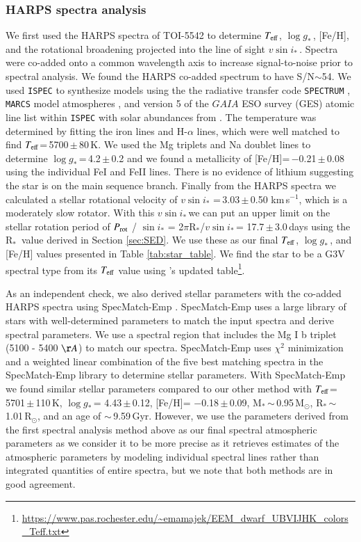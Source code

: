 \documentclass{aa}
\newcommand{\feh}{\mbox{[Fe/H]}\xspace}
\newcommand{\teff}{\ensuremath{T_{\rm eff}}\xspace}
\newcommand{\logg}{\mbox{$\log g_*$}\,}
\newcommand{\vsini}{\mbox{$v \sin i_{*}$}\,}
\newcommand{\mstar}{\mbox{M$_{*}$}}
\newcommand{\rstar}{\mbox{R$_{*}$}}
\newcommand{\msol}{\mbox{$\mathrm{M_\odot}$}\xspace}
\newcommand{\rsol}{\mbox{$\mathrm{R_\odot}$}\xspace}
\begin{document}
\subsubsection{HARPS spectra analysis}

We first used the HARPS spectra of TOI-5542 to determine \teff, \logg, \feh, and the rotational broadening projected into the line of sight \vsini. Spectra were co-added onto a common wavelength axis to increase signal-to-noise prior to spectral analysis. We found the HARPS co-added spectrum to have S/N$\sim$54. We used \texttt{ISPEC} \citep{Blanco-Cuaresma2014} to synthesize models using the the radiative transfer code \texttt{SPECTRUM} \citep{Gray1999}, \texttt{MARCS} model atmospheres \citep{Gustafsson2008}, and version 5 of the $GAIA$ ESO survey (GES) atomic line list within \texttt{ISPEC} with solar abundances from \citet{Asplund2009}. The temperature was determined by fitting the iron lines and H-$\alpha$ lines, which were well matched to find \teff=\,5700\,$\pm$\,80\,K. We used the Mg triplets and Na doublet lines to determine \logg=\,4.2\,$\pm$\,0.2 and we found a metallicity of \feh=\,$-$0.21\,$\pm$\,0.08 using the individual FeI and FeII lines. There is no evidence of lithium suggesting the star is on the main sequence branch. Finally from the HARPS spectra we calculated a stellar rotational velocity of \vsini\,=\,3.03\,$\pm$\,0.50 km\,s$^{-1}$, which is a moderately slow rotator. With this \vsini we can put an upper limit on the stellar rotation period of $P_{\rm rot}$ / $\sin i_{*}$ = 2$\pi$\rstar/\vsini = 17.7\,$\pm$\,3.0\,days using the \rstar\, value derived in Section \ref{sec:SED}. We use these as our final \teff, \logg, and \feh values presented in Table \ref{tab:star_table}. We find the star to be a G3V spectral type from its \teff value using \citet{PecautMamajek2013}'s updated table\footnote{\url{https://www.pas.rochester.edu/~emamajek/EEM_dwarf_UBVIJHK_colors_Teff.txt}}.

As an independent check, we also derived stellar parameters with the co-added HARPS spectra using SpecMatch-Emp \citep{Yee2017}. SpecMatch-Emp uses a large library of stars with well-determined parameters to match the input spectra and derive spectral parameters. We use a spectral region that includes the Mg I b triplet (5100 - 5400 $\AA$) to match our spectra. SpecMatch-Emp uses $\chi^{2}$ minimization and a weighted linear combination of the five best matching spectra in the SpecMatch-Emp library to determine stellar parameters. With SpecMatch-Emp we found similar stellar parameters compared to our other method with \teff = 5701\,$\pm$\,110\,K, \logg = 4.43\,$\pm$\,0.12, \feh = $-$0.18\,$\pm$\,0.09, \mstar\,$\sim$\,0.95\,\msol, \rstar\,$\sim$\,1.01\,\rsol, and an age of $\sim$\,9.59\,Gyr. However, we use the parameters derived from the first spectral analysis method above as our final spectral atmospheric parameters as we consider it to be more precise as it retrieves estimates of the atmospheric parameters by modeling individual spectral lines rather than integrated quantities of entire spectra, but we note that both methods are in good agreement.
\end{document}
